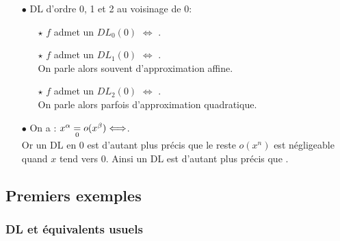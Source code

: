 \documentclass[a4paper, 11pt]{article}
\begin{document}
\begin{rems}
\begin{itemize}
\item[$\bullet$] DL d'ordre 0, 1 et 2 au voisinage de 0:
\begin{itemize}
\item[$\star$] $f$ admet un $DL_0(0)$ $\Longleftrightarrow$ \dotfill.\vsec
\item[$\star$] $f$ admet un $DL_1(0)$ $\Longleftrightarrow$ \dotfill.\\
\noindent On parle alors souvent d'approximation affine.\vsec
\item[$\star$] $f$ admet un $DL_2(0)$ $\Longleftrightarrow$ \dotfill.\\
\noindent On parle alors parfois d'approximation quadratique.\vsec
\end{itemize}
\item[$\bullet$] On a : $x^{\alpha}\underset{0}{=} o(x^{\beta})\Longleftrightarrow \dotfill$.\vsec\\
\noindent Or  un DL en $0$ est d'autant plus pr\'ecis que le reste $o(x^n)$ est n\'egligeable quand $x$ tend vers 0. Ainsi un DL est d'autant plus pr\'ecis que \dotfill.
\end{itemize}
\end{rems}



\subsection{Premiers exemples}

\subsubsection{DL et  \'equivalents usuels}
\end{document}
